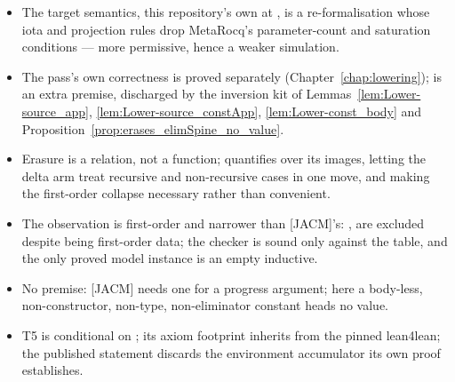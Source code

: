 \begin{itemize}
\item {} The target semantics, this repository's own \WcbvEval{} at , is a
re-formalisation whose iota and projection rules drop MetaRocq's parameter-count and saturation
conditions --- more
permissive, hence a weaker simulation.
\item {} The pass's own correctness is proved separately (Chapter~\ref{chap:lowering});
\LowerEnv{} is an extra premise, discharged by the inversion kit of
Lemmas~\ref{lem:Lower-source_app}, \ref{lem:Lower-source_constApp}, \ref{lem:Lower-const_body} and
Proposition~\ref{prop:erases_elimSpine_no_value}.
\item {} Erasure is a relation, not a function;  quantifies over its
images, letting the delta arm treat recursive and non-recursive cases in one move, and making the
first-order collapse necessary rather than convenient.
\item {} The observation is first-order and narrower than [JACM]'s: ,  are
excluded despite  being first-order data; the checker is sound only against the table, and
the only proved model instance is an empty inductive.
\item {} No  premise: [JACM] needs one for a progress argument; here a
body-less, non-constructor, non-type, non-eliminator constant heads no \SEval{} value.
\item {} T5 is conditional on ; its axiom footprint inherits
 from the pinned lean4lean; the published statement discards the environment accumulator
its own proof establishes.
\end{itemize}
